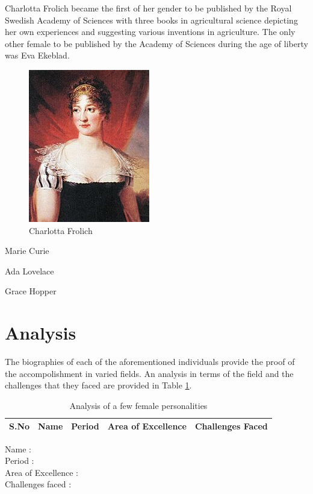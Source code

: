 \documentclass[a4paper,10pt]{article}
\begin{document}
\newblock
Charlotta Frolich became the first of her gender to be published by the Royal Swedish Academy of Sciences with three books in agricultural science depicting her own experiences and suggesting various inventions in agriculture. The only other female to be published by the Academy of Sciences during the age of liberty was Eva Ekeblad\cite{frolich}.

\begin{center}
\begin{figure}[h]
\centering
 \includegraphics[scale=0.7]{charlotta.jpg}
 \caption{Charlotta Frolich}
\end{figure}
\end{center}

Marie Curie

Ada Lovelace

Grace Hopper

\section{Analysis}
\label{sec:analysis}
The biographies of each of the aforementioned individuals provide the proof of the accompolishment in varied fields. An analysis in terms of the field and the challenges that they faced are provided in Table \ref{tab:analysis}.
\begin{table}
\label{tab:analysis}
\caption{Analysis of a few female personalities}
\centering
 \begin{tabular}{|l|l|l|l|l|}
  \hline
  S.No & Name & Period & Area of Excellence & Challenges Faced \\
  \hline
 
 \end{tabular}

\end{table}


\newblock
Name : \\
Period : \\
Area of Excellence : \\
Challenges faced : \\
\end{document}
